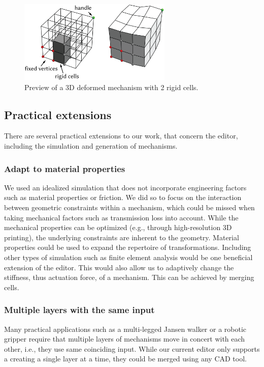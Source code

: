 \begin{figure} [h]
    \centering
    \includegraphics[width=0.65\textwidth]{chapters/understanding-metamaterial-mechanisms-FIG/19-3D-grid.png}
    \caption[Short figure name.]{Preview of a 3D deformed mechanism with 2 rigid cells.
    \label{fig:19-3D-grid}}
\end{figure}


\subsection{Practical extensions}

There are several practical extensions to our work, that concern the editor, including the simulation and generation of mechanisms. 

\subsubsection{Adapt to material properties}
We used an idealized simulation that does not incorporate engineering factors such as material properties or friction. We did so to focus on the interaction between geometric constraints within a mechanism, which could be missed when taking mechanical factors such as transmission loss into account. While the mechanical properties can be optimized (e.g., through high-resolution 3D printing), the underlying constraints are inherent to the geometry. Material properties could be used to expand the repertoire of transformations. Including other types of simulation such as finite element analysis would be one beneficial extension of the editor. This would also allow us to adaptively change the stiffness, thus actuation force, of a mechanism. This can be achieved by merging cells.

\subsubsection{Multiple layers with the same input}
Many practical applications such as a multi-legged Jansen walker or a robotic gripper require that multiple layers of mechanisms move in concert with each other, i.e., they use same coinciding input.  While our current editor only supports a creating a single layer at a time, they could be merged using any CAD tool.

